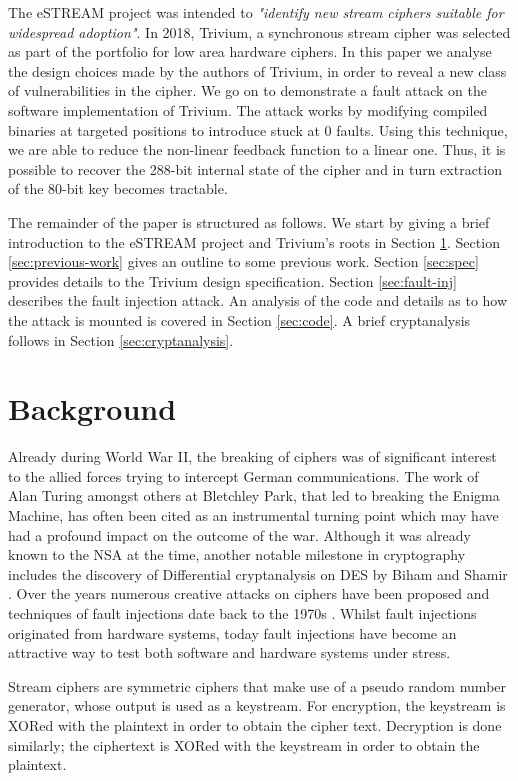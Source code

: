 \documentclass[conference]{IEEEtran}
\begin{document}
The eSTREAM project was intended to \textit{"identify new stream ciphers suitable for widespread adoption"}.\cite{call} In 2018, Trivium, a synchronous stream cipher was selected as part of the portfolio for low area hardware ciphers. In this paper we analyse the design choices made by the authors of Trivium, in order to reveal a new class of vulnerabilities in the cipher. We go on to demonstrate a fault attack on the software implementation of Trivium. The attack works by modifying compiled binaries at targeted positions to introduce stuck at 0 faults. Using this technique, we are able to reduce the non-linear feedback function to a linear one. Thus, it is possible to recover the 288-bit internal state of the cipher and in turn extraction of the 80-bit key becomes tractable.

The remainder of the paper is structured as follows. We start by giving a brief introduction to the eSTREAM project and Trivium's roots in Section \ref{sec:background}. Section \ref{sec:previous-work} gives an outline to some previous work. Section \ref{sec:spec} provides details to the Trivium design specification. Section \ref{sec:fault-inj} describes the fault injection attack. An analysis of the code and details as to how the attack is mounted is covered in Section \ref{sec:code}. A brief cryptanalysis follows in Section \ref{sec:cryptanalysis}.

\section{Background}\label{sec:background}

Already during World War II, the breaking of ciphers was of significant interest to the allied forces trying to intercept German communications. The work of Alan Turing amongst others at Bletchley Park, that led to breaking the Enigma Machine, has often been cited as an instrumental turning point which may have had a profound impact on the outcome of the war.
Although it was already known to the NSA at the time, another notable milestone in cryptography includes the discovery of Differential cryptanalysis on DES by Biham and Shamir \cite{des}. Over the years numerous creative attacks on ciphers have been proposed and techniques of fault injections date back to the 1970s \cite{history}. Whilst fault injections originated from hardware systems, today fault injections have become an attractive way to test both software and hardware systems under stress.

Stream ciphers are symmetric ciphers that make use of a pseudo random number generator, whose output is used as a keystream. For encryption, the keystream is XORed with the plaintext in order to obtain the cipher text. Decryption is done similarly; the ciphertext is XORed with the keystream in order to obtain the plaintext.
\end{document}
